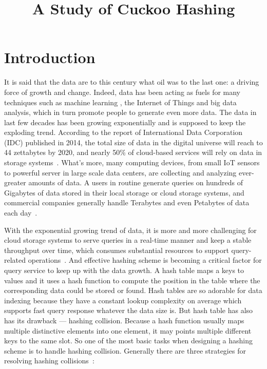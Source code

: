 \documentclass[12pt,conference,compsoc]{IEEEtran}
\begin{document}
\title{A Study of Cuckoo Hashing}
\author{}
\maketitle
\IEEEpeerreviewmaketitle

\section{Introduction}
It is said that the data are to this century what oil was to the last one: a driving force of growth and change. Indeed, data has been acting as fuels for many techniques such as machine learning , the Internet of Things and big data analysis, which in turn promote people to generate even more data. The data in last few decades has been growing exponentially and is supposed to keep the exploding trend. According to the report of International Data Corporation (IDC) published in 2014, the total size of data in the digital universe will reach to 44 zettabytes by 2020, and nearly 50\% of cloud-based services will rely on data in storage systems~\cite{IDC}. What's more, many computing devices, from small IoT sensors to powerful server in large scale data centers, are collecting and analyzing ever-greater amounts of data. A users in routine generate queries on hundreds of Gigabytes of data stored in their local storage or cloud storage systems, and commercial companies generally handle Terabytes and even Petabytes of data each day~\cite{IDC}.

With the exponential growing trend of data, it is more and more challenging for cloud storage systems to serve queries in a real-time manner and keep a stable throughput over time, which consumes substantial resources to support query-related operations~\cite{SmartCuckoo}. And effective hashing scheme is becoming a critical factor for query service to keep up with the data growth. A hash table maps a keys to values and it uses a hash function to compute the position in the table where the corresponding data could be stored or found. Hash tables are so adorable for data indexing because they have a constant lookup complexity on average which supports fast query response whatever the data size is. But hash table has also has its drawback --- hashing collision. Because a hash function usually maps multiple distinctive elements into one element, it may points multiple different keys to the same slot. So one of the most basic tasks when designing a hashing scheme is to handle hashing collision. Generally there are three strategies for resolving hashing collisions~\cite{cuckooTutorial}:
\end{document}
